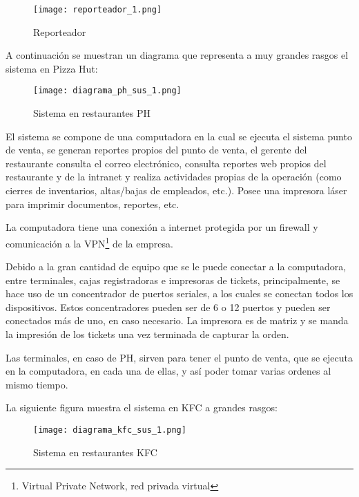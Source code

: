 \begin{figure}[htb]
 \begin{center}
  \texttt{[image: reporteador\_1.png]}
 \end{center}
 \caption{Reporteador}
 \label{fig:reporteador}
\end{figure}

A continuación se muestran un diagrama que representa a muy grandes rasgos el sistema en Pizza Hut:

\begin{figure}[htb]
 \begin{center}
  \texttt{[image: diagrama\_ph\_sus\_1.png]}
 \end{center}
 \caption{Sistema en restaurantes PH}
 \label{fig:sist_rest_ph}
\end{figure}

El sistema se compone de una computadora en la cual se ejecuta el sistema punto de venta, se generan reportes propios del punto de venta, el gerente del restaurante consulta el correo electrónico, consulta reportes web propios del restaurante y de la intranet y realiza actividades propias de la operación (como cierres de inventarios, altas/bajas de empleados, etc.). Posee una impresora láser para imprimir documentos, reportes, etc.

La computadora tiene una conexión a internet protegida por un firewall y comunicación a la VPN\footnote{Virtual Private Network, red privada virtual} de la empresa.

Debido a la gran cantidad de equipo que se le puede conectar a la computadora, entre terminales, cajas registradoras e impresoras de tickets, principalmente, se hace uso de un concentrador de puertos seriales, a los cuales se conectan todos los dispositivos. Estos concentradores pueden ser de 6 o 12 puertos y pueden ser conectados más de uno, en caso necesario. La impresora es de matriz y se manda la impresión de los tickets una vez terminada de capturar la orden.

Las terminales, en caso de PH, sirven para tener el punto de venta, que se ejecuta en la computadora, en cada una de ellas, y así poder tomar varias ordenes al mismo tiempo.


La siguiente figura muestra el sistema en KFC a grandes rasgos:

\begin{figure}[htb]
 \begin{center}
  \texttt{[image: diagrama\_kfc\_sus\_1.png]}
 \end{center}
 \caption{Sistema en restaurantes KFC}
 \label{fig:sist_rest_kfc}
\end{figure}

